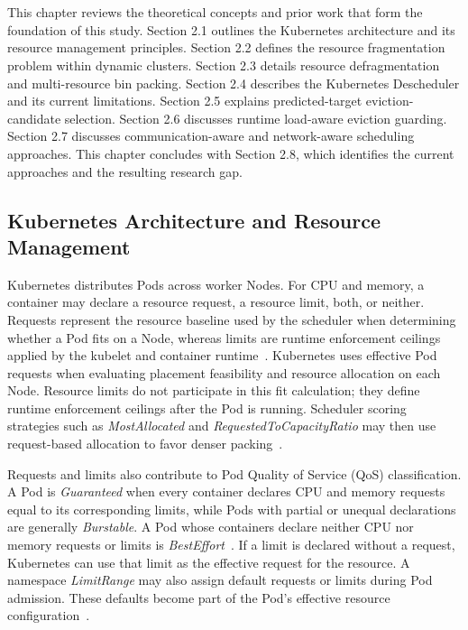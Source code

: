 \chapter{\babDua}
\label{bab:2}

This chapter reviews the theoretical concepts and prior work that form the foundation of this study. Section 2.1 outlines the Kubernetes architecture and its resource management principles. Section 2.2 defines the resource fragmentation problem within dynamic clusters. Section 2.3 details resource defragmentation and multi-resource bin packing. Section 2.4 describes the Kubernetes Descheduler and its current limitations. Section 2.5 explains predicted-target eviction-candidate selection. Section 2.6 discusses runtime load-aware eviction guarding. Section 2.7 discusses communication-aware and network-aware scheduling approaches. This chapter concludes with Section 2.8, which identifies the current approaches and the resulting research gap.

\section{Kubernetes Architecture and Resource Management}
\label{sec:kubernetesArchitecture}

Kubernetes distributes Pods across worker Nodes. For CPU and memory, a container may declare a resource request, a resource limit, both, or neither. Requests represent the resource baseline used by the scheduler when determining whether a Pod fits on a Node, whereas limits are runtime enforcement ceilings applied by the kubelet and container runtime~\citep{k8s_resource_management}. Kubernetes uses effective Pod requests when evaluating placement feasibility and resource allocation on each Node. Resource limits do not participate in this fit calculation; they define runtime enforcement ceilings after the Pod is running. Scheduler scoring strategies such as \textit{MostAllocated} and \textit{RequestedToCapacityRatio} may then use request-based allocation to favor denser packing~\citep{k8s_resource_bin_packing}.

Requests and limits also contribute to Pod Quality of Service (QoS) classification. A Pod is \textit{Guaranteed} when every container declares CPU and memory requests equal to its corresponding limits, while Pods with partial or unequal declarations are generally \textit{Burstable}. A Pod whose containers declare neither CPU nor memory requests or limits is \textit{BestEffort}~\citep{k8s_pod_qos}. If a limit is declared without a request, Kubernetes can use that limit as the effective request for the resource. A namespace \textit{LimitRange} may also assign default requests or limits during Pod admission. These defaults become part of the Pod's effective resource configuration~\citep{k8s_limit_range}.

